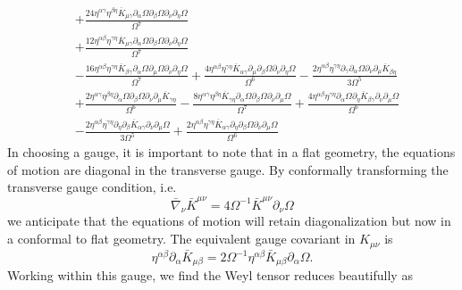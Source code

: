 \documentclass[10pt,letterpaper]{article}
\newcommand{\be}{\begin{equation}} %
\newcommand{\ee}{\end{equation}} %
\newcommand{\del}{\nabla} %
\newcommand{\pd}{\partial}
\numberwithin{equation}{section}
\begin{document}
\begin{align}
&+ \frac{24 \eta^{\alpha \gamma} \eta^{\beta \eta} \overline{K}_{\mu \gamma} \partial_{\alpha}\Omega \partial_{\beta}\Omega \partial_{\nu}\partial_{\eta}\Omega}{\Omega^7} \nonumber \\
&+ \frac{12 \eta^{\alpha \beta} \eta^{\gamma \eta} \overline{K}_{\mu \gamma} \partial_{\alpha}\Omega \partial_{\beta}\Omega \partial_{\nu}\partial_{\eta}\Omega}{\Omega^7}\nonumber \\
& -  \frac{16 \eta^{\alpha \beta} \eta^{\gamma \eta} \overline{K}_{\beta \gamma} \partial_{\alpha}\Omega \partial_{\mu}\Omega \partial_{\nu}\partial_{\eta}\Omega}{\Omega^7} + \frac{4 \eta^{\alpha \beta} \eta^{\gamma \eta} \overline{K}_{\alpha \gamma} \partial_{\mu}\partial_{\beta}\Omega \partial_{\nu}\partial_{\eta}\Omega}{\Omega^6} -  \frac{2 \eta^{\alpha \beta} \eta^{\gamma \eta} \partial_{\gamma}\partial_{\alpha}\Omega \partial_{\nu}\partial_{\mu}\overline{K}_{\beta \eta}}{3 \Omega^5} \nonumber \\
&+ \frac{2 \eta^{\alpha \gamma} \eta^{\beta \eta} \partial_{\alpha}\Omega \partial_{\beta}\Omega \partial_{\nu}\partial_{\mu}\overline{K}_{\gamma \eta}}{\Omega^6} -  \frac{8 \eta^{\alpha \gamma} \eta^{\beta \eta} \overline{K}_{\gamma \eta} \partial_{\alpha}\Omega \partial_{\beta}\Omega \partial_{\nu}\partial_{\mu}\Omega}{\Omega^7} + \frac{4 \eta^{\alpha \beta} \eta^{\gamma \eta} \partial_{\alpha}\Omega \partial_{\eta}\overline{K}_{\beta \gamma} \partial_{\nu}\partial_{\mu}\Omega}{\Omega^6} \nonumber \\
&-  \frac{2 \eta^{\alpha \beta} \eta^{\gamma \eta} \partial_{\eta}\partial_{\beta}\overline{K}_{\alpha \gamma} \partial_{\nu}\partial_{\mu}\Omega}{3 \Omega^5} + \frac{2 \eta^{\alpha \beta} \eta^{\gamma \eta} \overline{K}_{\alpha \gamma} \partial_{\eta}\partial_{\beta}\Omega \partial_{\nu}\partial_{\mu}\Omega}{\Omega^6}  \nonumber
\end{align}
In choosing a gauge, it is important to note that in a flat geometry, the equations of motion are diagonal in the transverse gauge. By conformally transforming the transverse gauge condition, i.e.
\be
	\bar \del_\nu \bar K^{\mu\nu} = 4\Omega^{-1}\bar K^{\mu\nu}\pd_\nu \Omega
\ee
we anticipate that the equations of motion will retain diagonalization but now in a conformal to flat geometry. The equivalent gauge covariant in $K_{\mu\nu}$ is
\be
	\eta^{\alpha\beta}\pd_\alpha \bar K_{\mu\beta} = 2\Omega^{-1}\eta^{\alpha\beta}\bar K_{\mu\beta}\pd_\alpha \Omega.
\ee
Working within this gauge, we find the Weyl tensor reduces beautifully as
\end{document}

